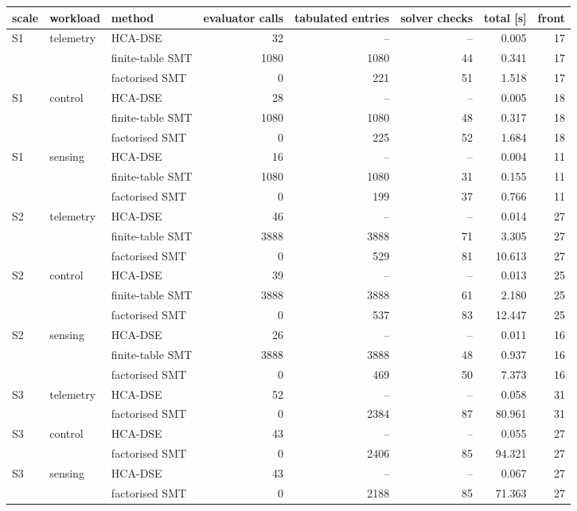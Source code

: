 \scriptsize
\begin{tabular}{lllrrrrr}
\toprule
scale & workload & method & evaluator calls & tabulated entries & solver checks & total [s] & front \\
\midrule
S1 & telemetry & HCA-DSE & 32 & -- & -- & 0.005 & 17 \\
 &  & finite-table SMT & 1080 & 1080 & 44 & 0.341 & 17 \\
 &  & factorised SMT & 0 & 221 & 51 & 1.518 & 17 \\
S1 & control & HCA-DSE & 28 & -- & -- & 0.005 & 18 \\
 &  & finite-table SMT & 1080 & 1080 & 48 & 0.317 & 18 \\
 &  & factorised SMT & 0 & 225 & 52 & 1.684 & 18 \\
S1 & sensing & HCA-DSE & 16 & -- & -- & 0.004 & 11 \\
 &  & finite-table SMT & 1080 & 1080 & 31 & 0.155 & 11 \\
 &  & factorised SMT & 0 & 199 & 37 & 0.766 & 11 \\
S2 & telemetry & HCA-DSE & 46 & -- & -- & 0.014 & 27 \\
 &  & finite-table SMT & 3888 & 3888 & 71 & 3.305 & 27 \\
 &  & factorised SMT & 0 & 529 & 81 & 10.613 & 27 \\
S2 & control & HCA-DSE & 39 & -- & -- & 0.013 & 25 \\
 &  & finite-table SMT & 3888 & 3888 & 61 & 2.180 & 25 \\
 &  & factorised SMT & 0 & 537 & 83 & 12.447 & 25 \\
S2 & sensing & HCA-DSE & 26 & -- & -- & 0.011 & 16 \\
 &  & finite-table SMT & 3888 & 3888 & 48 & 0.937 & 16 \\
 &  & factorised SMT & 0 & 469 & 50 & 7.373 & 16 \\
S3 & telemetry & HCA-DSE & 52 & -- & -- & 0.058 & 31 \\
 &  & factorised SMT & 0 & 2384 & 87 & 80.961 & 31 \\
S3 & control & HCA-DSE & 43 & -- & -- & 0.055 & 27 \\
 &  & factorised SMT & 0 & 2406 & 85 & 94.321 & 27 \\
S3 & sensing & HCA-DSE & 43 & -- & -- & 0.067 & 27 \\
 &  & factorised SMT & 0 & 2188 & 85 & 71.363 & 27 \\
\bottomrule
\end{tabular}
